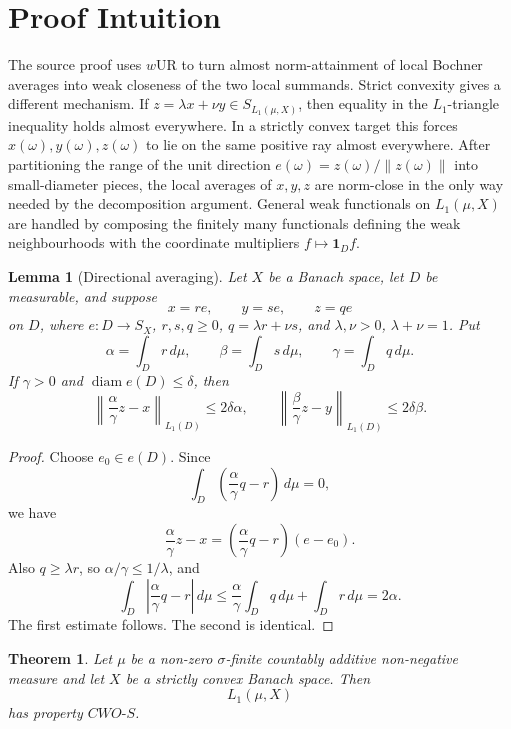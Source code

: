 \documentclass[11pt]{article}
\newtheorem{theorem}{Theorem}
\newtheorem{lemma}{Lemma}
\newcommand{\CWOS}{\textit{CWO-S}}
\newcommand{\one}{\mathbf 1}
\begin{document}
\section*{Proof Intuition}

The source proof uses \(w\)UR to turn almost norm-attainment of local Bochner
averages into weak closeness of the two local summands.  Strict convexity gives
a different mechanism.  If \(z=\lambda x+\nu y\in S_{L_1(\mu,X)}\), then
equality in the \(L_1\)-triangle inequality holds almost everywhere.  In a
strictly convex target this forces \(x(\omega),y(\omega),z(\omega)\) to lie on
the same positive ray almost everywhere.  After partitioning the range of the
unit direction \(e(\omega)=z(\omega)/\|z(\omega)\|\) into small-diameter
pieces, the local averages of \(x,y,z\) are norm-close in the only way needed
by the decomposition argument.  General weak functionals on \(L_1(\mu,X)\) are
handled by composing the finitely many functionals defining the weak
neighbourhoods with the coordinate multipliers \(f\mapsto \one_D f\).

\begin{lemma}[Directional averaging]\label{lem:direction}
Let \(X\) be a Banach space, let \(D\) be measurable, and suppose
\[
  x=r e,\qquad y=s e,\qquad z=q e
\]
on \(D\), where \(e:D\to S_X\), \(r,s,q\ge0\), \(q=\lambda r+\nu s\), and
\(\lambda,\nu>0\), \(\lambda+\nu=1\).  Put
\[
  \alpha=\int_D r\,d\mu,\qquad
  \beta=\int_D s\,d\mu,\qquad
  \gamma=\int_D q\,d\mu.
\]
If \(\gamma>0\) and \(\operatorname{diam} e(D)\le \delta\), then
\[
  \left\|\frac{\alpha}{\gamma}z-x\right\|_{L_1(D)}
  \le 2\delta\alpha,
  \qquad
  \left\|\frac{\beta}{\gamma}z-y\right\|_{L_1(D)}
  \le 2\delta\beta .
\]
\end{lemma}

\begin{proof}
Choose \(e_0\in e(D)\).  Since
\[
  \int_D\left(\frac{\alpha}{\gamma}q-r\right)\,d\mu=0,
\]
we have
\[
  \frac{\alpha}{\gamma}z-x
  =\left(\frac{\alpha}{\gamma}q-r\right)(e-e_0).
\]
Also \(q\ge \lambda r\), so \(\alpha/\gamma\le1/\lambda\), and
\[
  \int_D\left|\frac{\alpha}{\gamma}q-r\right|\,d\mu
  \le \frac{\alpha}{\gamma}\int_D q\,d\mu+\int_D r\,d\mu
  =2\alpha.
\]
The first estimate follows.  The second is identical.
\end{proof}

\begin{theorem}\label{thm:strict}
Let \(\mu\) be a non-zero \(\sigma\)-finite countably additive non-negative
measure and let \(X\) be a strictly convex Banach space.  Then
\[
  L_1(\mu,X)
\]
has property \(\CWOS\).
\end{theorem}
\end{document}
